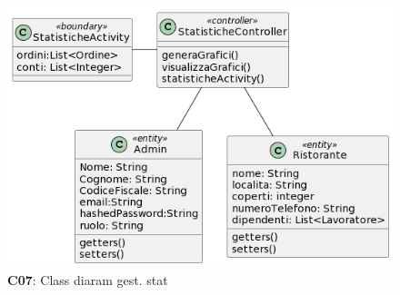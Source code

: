     
    \begin{figure}[H]
        \centering
        \includegraphics[scale=0.5]{assets/diagrammi/Class diagram di analisi/Gestione Stat.png}
        \caption{\textbf{C07}: Class diaram gest. stat}\label{fig:Statistiche}
    \end{figure}